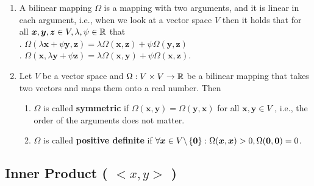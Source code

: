\begin{enumerate}
    \item A bilinear mapping $\Omega$ is a mapping with two arguments, and it is linear in each argument, i.e., when we look at a vector space $V$ then it holds that for all $\bm{x}, \bm{y}, \bm{z} \in V, \lambda , \psi  \in \mathbb{R}$ that
    \hfill \cite{mfml/book/mml/Deisenroth-Faisal-Ong}
    \\
    .\hfill
    $\Omega(\lambda \bm{x} + \psi \bm{y}, \bm{z}) = \lambda \Omega(\bm{x}, \bm{z}) + \psi \Omega(\bm{y}, \bm{z})$
    \hfill \cite{mfml/book/mml/Deisenroth-Faisal-Ong}
    \\
    .\hfill
    $\Omega(\bm{x}, \lambda \bm{y} + \psi \bm{z}) = \lambda \Omega(\bm{x}, \bm{y}) + \psi \Omega(\bm{x}, \bm{z})$.
    \hfill \cite{mfml/book/mml/Deisenroth-Faisal-Ong}

    \item Let $V$ be a vector space and $\Omega : V \times  V \to \mathbb{R}$ be a bilinear mapping that takes two vectors and maps them onto a real number. Then
    \hfill \cite{mfml/book/mml/Deisenroth-Faisal-Ong}
    \begin{enumerate}
        \item $\Omega$ is called \textbf{symmetric} if $\Omega(\bm{x}, \bm{y}) = \Omega(\bm{y}, \bm{x})$ for all $\bm{x}, \bm{y} \in  V$ , i.e., the order of the arguments does not matter.
        \hfill \cite{mfml/book/mml/Deisenroth-Faisal-Ong}

        \item $\Omega$ is called \textbf{positive definite} if $\forall \bm{x} \in  V \backslash \left\{\bm{0}\right\} : \Omega(\bm{x}, \bm{x}) > 0 , \Omega(\bm{0}, \bm{0}) = 0$.
        \hfill \cite{mfml/book/mml/Deisenroth-Faisal-Ong}
    \end{enumerate}

\end{enumerate}





\subsection{Inner Product ( $<x, y>$ )}

